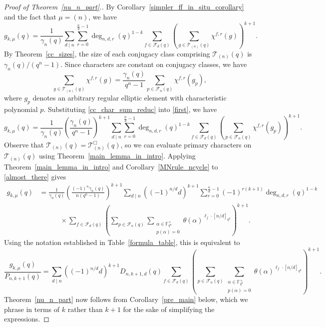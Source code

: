 \documentclass[10pt]{article}
\theoremstyle{definition}
\newcommand{\F}{\mathbb{F}}
\newcommand{\CF}{\mathcal{F}}
\newcommand{\CT}{\mathcal{T}}
\newcommand{\te}{\theta}
\begin{document}
\begin{proof}[Proof of Theorem~\ref{nu_n_part}.]
By Corollary~\ref{simpler_ff_in_situ_corollary} and the fact that \(\mu = (n)\), we have
\begin{equation}
\label{first}
g_{k,\mu} (q)
=
\frac{1}{\gamma_n(q)}
\sum_{d \mid n}
\sum_{r=0}^{\tfrac{n}{d}-1}
\deg_{n,d,r}(q)^{1-k}
\sum_{f \in \CF_d (q)}
\left ( \sum_{g \in \CT_{(n)} (q)} \chi^{f,r}(g) \right )^{k+1}.
\end{equation}
By Theorem~\ref{cc_sizes}, the size of each conjugacy class comprising \(\CT_{(n)} (q)\) is \(\gamma_n(q) / (q^n-1)\).
Since characters are constant on conjugacy classes, we have
\begin{equation}
\sum_{g \in \CT_{(n)} (q)}
\chi^{f,r} (g)
=
\frac{\gamma_n(q)}{q^n-1} \sum_{p \in \CF_n (q)} \chi^{f,r}(g_p),
\label{cc_char_sum_reduc}
\end{equation}
where \(g_p\) denotes an arbitrary regular elliptic element with characteristic polynomial \(p\).
Substituting \eqref{cc_char_sum_reduc} into \eqref{first}, we have
\begin{equation}
\label{almost_there}
g_{k,\mu} (q)
=
\frac{1}{\gamma_n(q) }
\left ( \frac{\gamma_n(q)}{q^n-1} \right )^{k+1}
\sum_{d \mid n}
\sum_{r = 0}^{\tfrac{n}{d} - 1} \deg_{n,d,r}(q)^{1-k} \sum_{f \in \CF_d (q)} \left ( \sum_{p \in \CF_n (q)} \chi^{f,r}(g_p) \right )^{k+1}.
\end{equation}
Observe that \(\CT_{(n)} (q) = \CT_{(n)}^\Box (q)\), so we can evaluate primary characters on \(\CT_{(n)} (q)\) using Theorem~\ref{main_lemma_in_intro}.
Applying Theorem~\ref{main_lemma_in_intro} and Corollary~\ref{MNrule_ncycle} to \eqref{almost_there} gives
\begin{align*}
g_{k,\mu} (q)
& =
\frac{1}{\gamma_n(q) }
\left ( \frac{(-1)^n \gamma_n(q)}{n(q^n-1)} \right )^{k+1}
\sum_{d \mid n} ((-1)^{n/d} d)^{k+1}
\sum_{r = 0}^{\tfrac{n}{d} - 1} (-1)^{r(k+1)} \deg_{n,d,r}(q)^{1-k} \\
& \quad \quad \quad \times
\sum_{f \in \CF_d (q)} \left ( \sum_{p \in \CF_n (q)} \sum_{\substack{\alpha \in \F_{q^n}^\times \\ p(\alpha) = 0}}
\te(\alpha)^{\ell_f \cdot [n/d]_{q^d}} \right )^{k+1}.
\end{align*}
Using the notation established in Table~\ref{formula_table}, this is equivalent to
\begin{equation}
\frac{g_{k,\mu} (q)}{P_{n,k+1}(q)}
=
\sum_{d \mid n} ((-1)^{n/d} d)^{k+1}
D_{n,k+1,d}(q)
\sum_{f \in \CF_d (q)} \left ( \sum_{p \in \CF_n (q)} \sum_{\substack{\alpha \in \F_{q^n}^\times \\ p(\alpha) = 0}}
\te(\alpha)^{\ell_f \cdot [n/d]_{q^d}} \right )^{k+1}.
\end{equation}
Theorem~\ref{nu_n_part} now follows from Corollary~\ref{pre_main} below, which we phrase in terms of \(k\) rather than \(k+1\) for the sake of simplifying the expressions.
\end{proof}
\end{document}
